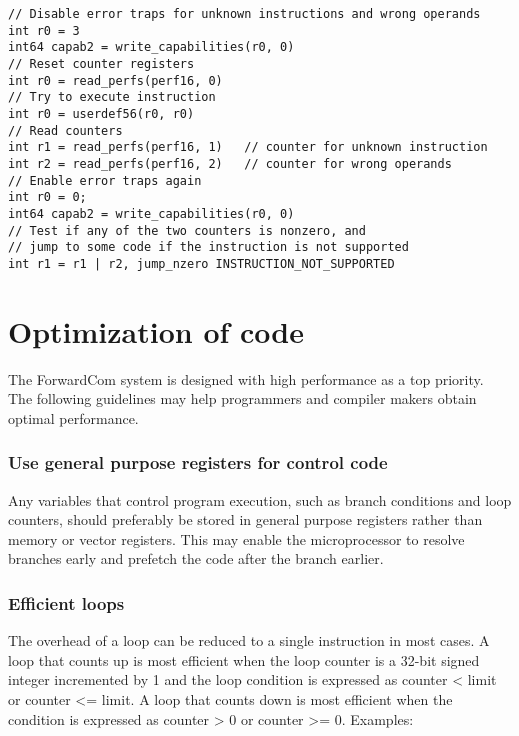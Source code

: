 \documentclass[forwardcom.tex]{subfiles}
\begin{document}
\begin{example}
\label{exampleDetectInstructionSupport}
\end{example}
\begin{lstlisting}[frame=single]
// Disable error traps for unknown instructions and wrong operands
int r0 = 3
int64 capab2 = write_capabilities(r0, 0)
// Reset counter registers
int r0 = read_perfs(perf16, 0)
// Try to execute instruction
int r0 = userdef56(r0, r0)
// Read counters
int r1 = read_perfs(perf16, 1)   // counter for unknown instruction
int r2 = read_perfs(perf16, 2)   // counter for wrong operands
// Enable error traps again
int r0 = 0;
int64 capab2 = write_capabilities(r0, 0)
// Test if any of the two counters is nonzero, and
// jump to some code if the instruction is not supported
int r1 = r1 | r2, jump_nzero INSTRUCTION_NOT_SUPPORTED
\end{lstlisting}
\vv



\section{Optimization of code}
\label{OptimizationOfCode}

The ForwardCom system is designed with high performance as a top priority. The following guidelines may help programmers and compiler makers obtain optimal performance.
\vv

\subsubsection{Use general purpose registers for control code}
Any variables that control program execution, such as branch conditions and loop counters, should preferably be stored in general purpose registers rather than memory or vector registers. This may enable the microprocessor to resolve branches early and prefetch the code after the branch earlier.
\vv

\subsubsection{Efficient loops}
The overhead of a loop can be reduced to a single instruction in most cases. 
A loop that counts up is most efficient when the loop counter is a 32-bit signed integer incremented by 1 and the loop condition is expressed as counter < limit or counter <= limit. A loop that counts down is most efficient when the condition is expressed as counter > 0 or counter >= 0. 
Examples:
\end{document}
